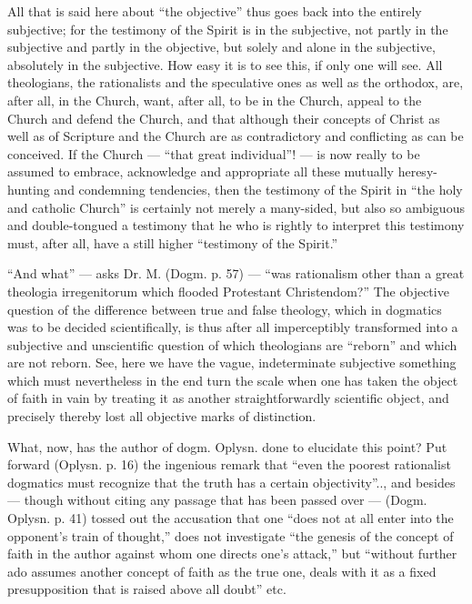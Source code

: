 \documentclass[12pt,a4paper,openany]{book}
\newcommand{\opage}[1]{\marginnote{\footnotesize\textit{[#1]}}}
\begin{document}
All that is said here about ``the objective'' thus goes
back into the entirely subjective; for the testimony of the Spirit
is in the subjective, not partly in the subjective and partly
in the objective, but solely and alone in the subjective, absolutely
in the subjective. How easy it is to see this, if
only one will see. All theologians, the rationalists and the
speculative ones as well as the orthodox, are, after all, in the Church,
want, after all, to be in the Church, appeal to the Church and defend
the Church, and that although their concepts of Christ
as well as of Scripture and the Church are as contradictory and conflicting
as can be conceived. If the Church --- ``that great
individual''! --- is now really to be assumed to embrace, acknowledge and appropriate
all these mutually heresy-hunting and condemning
tendencies, then the testimony of the Spirit in ``the holy
and catholic Church'' is certainly not merely a many-sided, but also
so ambiguous and double-tongued a testimony that he who
is rightly to interpret this testimony must, after all, have a still
higher ``testimony of the Spirit.''

``And what'' --- asks Dr. M. (Dogm. p. 57) ---
``was rationalism other than a great theologia
irregenitorum which flooded Protestant Christendom?''
The objective question of the difference between true
and false theology, which in dogmatics was to be decided scientifically,
is thus after all imperceptibly transformed into a subjective
and unscientific question of which theologians are
\setcounter{footnote}{0}%
\opage{61}``reborn'' and which are not reborn. See, here we have
the vague, indeterminate subjective something which must nevertheless in the end
turn the scale when one has taken the object of faith in vain by treating it as another straightforwardly scientific
object, and precisely thereby lost all objective marks of distinction.

What, now, has the author of dogm. Oplysn. done to
elucidate this point? Put forward (Oplysn. p. 16) the ingenious
remark that ``even the poorest rationalist dogmatics
must recognize that the truth has a certain objectivity''..,
and besides --- though without citing any passage
that has been passed over --- (Dogm. Oplysn. p. 41) tossed out the
accusation that one ``does not at all enter into the opponent's
train of thought,'' does not investigate ``the genesis of the concept of faith
in the author against whom one directs one's attack,'' but
``without further ado assumes another concept of faith as the true one,
deals with it as a fixed presupposition that is raised
above all doubt'' etc.
\end{document}
